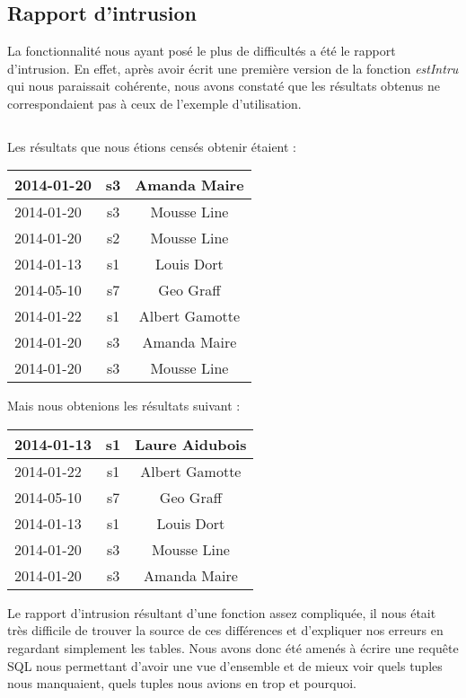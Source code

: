 \subsection{Rapport d'intrusion}
La fonctionnalité nous ayant posé le plus de difficultés a été le rapport d'intrusion. En effet, après avoir écrit une première version de la fonction \textit{estIntru} qui nous paraissait cohérente, nous avons constaté que les résultats obtenus ne correspondaient pas à ceux de l'exemple d'utilisation. \\

\inputminted[tabsize=4,linenos,fontsize=\small]{sql}{code/1.sql}

Les résultats que nous étions censés obtenir étaient :
\begin{center}
	\begin{tabular}
		{| l |	c |	c |} \hline
		2014-01-20 & s3 & Amanda Maire \\ \hline
		2014-01-20 & s3 & Mousse Line \\ \hline
		2014-01-20 & s2 & Mousse Line \\ \hline
		2014-01-13 & s1 & Louis Dort \\ \hline
		2014-05-10 & s7 & Geo Graff \\ \hline
		2014-01-22 & s1 & Albert Gamotte \\ \hline
		2014-01-20 & s3 & Amanda Maire \\ \hline
		2014-01-20 & s3 & Mousse Line \\ \hline
	\end{tabular}
\end{center}

Mais nous obtenions les résultats suivant :
\begin{center}
	\begin{tabular}
		{| l |	c |	c |} \hline
		2014-01-13 & s1 & Laure Aidubois \\ \hline
		2014-01-22 & s1 & Albert Gamotte \\ \hline
		2014-05-10 & s7 & Geo Graff \\ \hline
		2014-01-13 & s1 & Louis Dort \\ \hline
		2014-01-20 & s3 & Mousse Line \\ \hline
		2014-01-20 & s3 & Amanda Maire \\ \hline
	\end{tabular}
\end{center}



Le rapport d'intrusion résultant d'une fonction assez compliquée, il nous était très difficile de trouver la source de ces différences et d'expliquer nos erreurs en regardant simplement les tables. Nous avons donc été amenés à écrire une requête SQL nous permettant d'avoir une vue d'ensemble et de mieux voir quels tuples nous manquaient, quels tuples nous avions en trop et pourquoi.\\

